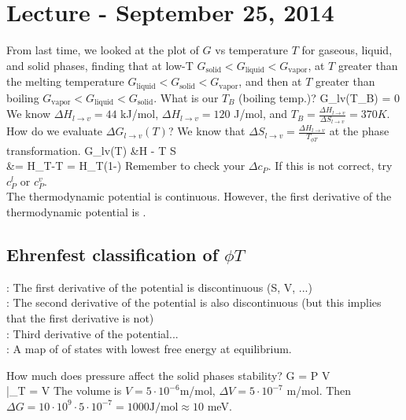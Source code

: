 \documentclass[12pt]{article}
\begin{document}
\section{Lecture - September 25, 2014}
From last time, we looked at the plot of $G$ vs temperature $T$ for gaseous, liquid, and solid phases, finding that at low-T $G_\text{solid} < G_\text{liquid} <  G_\text{vapor}$, at $T$ greater than the melting temperature $G_\text{liquid} < G_\text{solid} <  G_\text{vapor}$, and then at $T$ greater than boiling $G_\text{vapor} < G_\text{liquid} <  G_\text{solid}$.  What is our $T_B$ (boiling temp.)?
\eqs
\Delta G_{l\rightarrow v}(T_B) = 0
\eqe
We know $\Delta H_{l\rightarrow v} = 44$ kJ/mol, $\Delta H_{l\rightarrow v} = 120$ J/mol, and $T_B = \frac{\Delta H_{l\rightarrow v}}{\Delta S_{l\rightarrow v}} = 370 K$.  How do we evaluate $\Delta G_{l\rightarrow v}(T)$?  We know that $\Delta S_{l\rightarrow v} = \frac{\Delta H_{l\rightarrow v}}{T_{\phi T}}$ at the phase transformation.
\eqs
\Delta G_{l\rightarrow v}(T) &\approx \Delta H - T \Delta S\\
&= \Delta H_{\phi T}-T = \Delta H_{\phi T}(1-)
\eqe
Remember to check your $\Delta c_P$.  If this is not correct, try $c_P^{l}$ or $c_P^{v}$.\\

The thermodynamic potential is continuous.  However, the first derivative of the thermodynamic potential is .

\subsection{Ehrenfest classification of $\phi T$}
:  The first derivative of the potential is discontinuous (S, V, ...)\\
:  The second derivative of the potential is also discontinuous (but this implies that the first derivative is not)\\
: Third derivative of the potential...\\

:  A map of of states with lowest free energy at equilibrium.

How much does pressure affect the solid phases stability?
\eqs
\Delta G = \Delta P \cdot \Delta V\\
|_T = V
\eqe
The volume is $V = 5 \cdot 10^{-6}$m\three/mol, $\Delta V = 5 \cdot 10^{-7}$ m\three/mol.  Then $\Delta G = 10\cdot 10^{9} \cdot 5 \cdot 10^{-7} = 1000 \text{J/mol} \approx 10$ meV.
\end{document}
